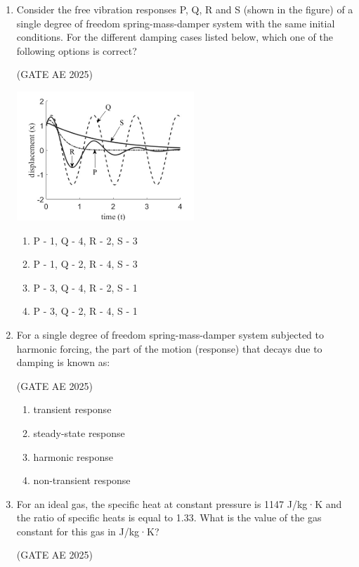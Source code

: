 \documentclass[journal,12pt,onecolumn]{IEEEtran}
\theoremstyle{remark}
\begin{document}
\begin{flushleft}
\begin{enumerate}
\item Consider the free vibration responses P, Q, R and S (shown in the figure) of a single degree of freedom spring-mass-damper system with the same initial conditions. For the different damping cases listed below, which one of the following options is correct? 

\hfill (GATE AE 2025)

\begin{center}
\includegraphics[width=0.5\columnwidth]{figs/xt.png}
\caption{}
\label{fig:placeholder}
\end{center}
\begin{enumerate}
    \item P - 1, Q - 4, R - 2, S - 3
    \item P - 1, Q - 2, R - 4, S - 3
    \item P - 3, Q - 4, R - 2, S - 1
    \item P - 3, Q - 2, R - 4, S - 1
\end{enumerate}

\item For a single degree of freedom spring-mass-damper system subjected to harmonic forcing, the part of the motion (response) that decays due to damping is known as:

\hfill (GATE AE 2025)

 \begin{enumerate}
    \item transient response
    \item steady-state response
    \item harmonic response
    \item non-transient response
 \end{enumerate}   


\item For an ideal gas, the specific heat at constant pressure is 1147 J/kg·K and the ratio of specific heats is equal to 1.33. What is the value of the gas constant for this gas in J/kg·K? 

\hfill (GATE AE 2025)


\end{enumerate}
\end{flushleft}
\end{document}
